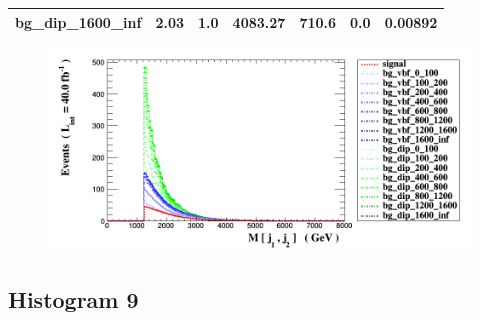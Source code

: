 \documentclass[a4paper, 10pt]{article}
\begin{document}
\begin{table}[H]
\begin{center}
\begin{tabular}{|m{23.0mm}|m{23.0mm}|m{18.0mm}|m{19.0mm}|m{19.0mm}|m{19.0mm}|m{19.0mm}|}
      \hline
      {\cellcolor{white}         bg\_dip\_1600\_inf}& {\cellcolor{white}         2.03}& {\cellcolor{white}         1.0}& {\cellcolor{white}         4083.27}& {\cellcolor{white}         710.6}& {\cellcolor{green}         0.0}& {\cellcolor{green}         0.00892}\\
\hline
    \end{tabular}
  \end{center}
\end{table}

\begin{figure}[H]
  \begin{center}
    \includegraphics[scale=0.45]{selection_7.png}\\
\caption{   }
  \end{center}
\end{figure}
      \newpage
\subsection{ Histogram 9}
\end{document}
